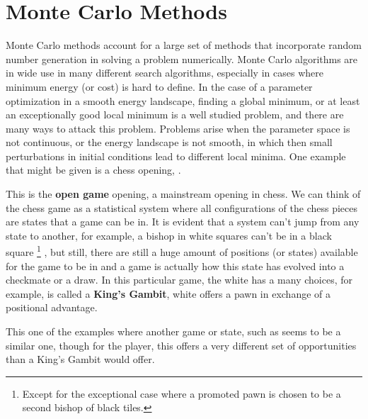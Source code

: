 \chapter{Monte Carlo Methods}
\thispagestyle{empty}

Monte Carlo methods account for a large set of methods that incorporate random number generation in solving a problem numerically. Monte Carlo algorithms are in wide use in many different search algorithms, especially in cases where minimum energy (or cost) is hard to define. In the case of a parameter optimization in a smooth energy landscape, finding a global minimum, or at least an exceptionally good local minimum is a well studied problem, and there are many ways to attack this problem. Problems arise when the parameter space is not continuous, or the energy landscape is not smooth, in which then small perturbations in initial conditions lead to different local minima. One example that might be given is a chess opening, \newgame
{}.

\begin{center}
\showboard
\end{center}

This is the \textbf{open game} opening, a mainstream opening in chess. We can think of the chess game as a statistical system where all configurations of the chess pieces are states that a game can be in. It is evident that a system can't jump from any state to another, for example, a bishop in white squares can't be in a black square \footnote{Except for the exceptional case where a promoted pawn is chosen to be a second bishop of black tiles.} 
, but still, there are still a huge amount of positions (or states) available for the game to be in and a game is actually how this state has evolved into a checkmate or a draw. In this particular game, the white has a many choices, for example,  is  called a \textbf{King's Gambit}, white offers a pawn in exchange of a positional advantage. 

\begin{center}
\showboard
\end{center}
\newgame
This one of the examples where another game or state, such as   seems to be a similar one, though for the player, this offers a very different set of opportunities than a King's Gambit would offer.

\begin{center}
\showboard
\end{center}

